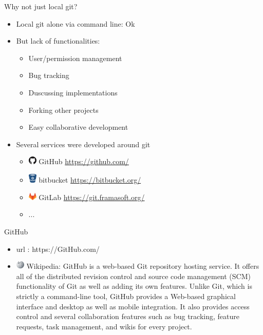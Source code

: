 \def\git#1{{\small\color{git}\$ git #1}\\}

\begin{frame}[fragile]{Why not just local git?}
  \begin{itemize}
  \item<1-> Local git alone via command line: Ok
  \item<2-> But lack of functionalities:
    \begin{itemize}
    \item User/permission management
    \item Bug tracking
    \item Duscussing implementations
    \item Forking other projects
    \item Easy collaborative development 
    \end{itemize}
  \item<3-> Several services were developed around git
    \begin{itemize}
    \item \includegraphics[width=15px]{images/GitHub-Mark.png} GitHub \url{https://github.com/}
    \item \includegraphics[width=15px]{images/bitbucket.png} bitbucket \url{https://bitbucket.org/}
    \item \includegraphics[width=15px]{images/GitLab_Logo.png} GitLab \url{https://git.framasoft.org/}
    \item ...
    \end{itemize}
  \end{itemize}
\end{frame}

\begin{frame}{GitHub}
  \begin{itemize}
  \item url : https://GitHub.com/ 
  \item \includegraphics[width=15px]{images/Wikipedia_logo.png} Wikipedia: GitHub is a web-based Git repository hosting service. It offers all of the distributed revision control and source code management (SCM) functionality of Git as well as adding its own features. Unlike Git, which is strictly a command-line tool, GitHub provides a Web-based graphical interface and desktop as well as mobile integration. It also provides access control and several collaboration features such as bug tracking, feature requests, task management, and wikis for every project.
  \end{itemize}
\end{frame}

